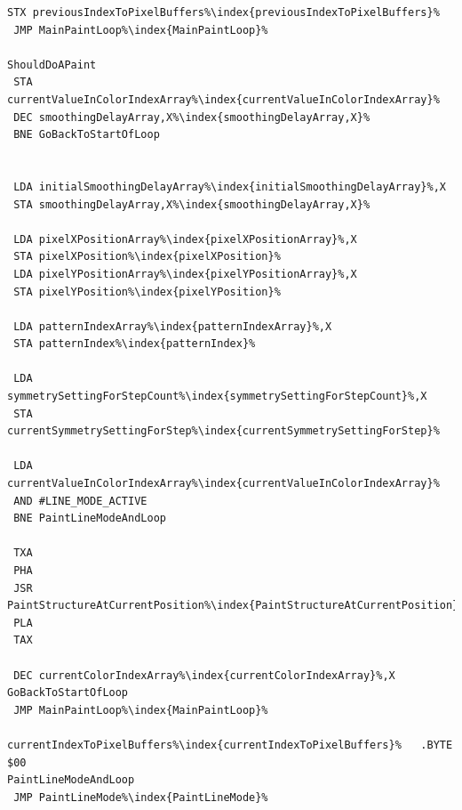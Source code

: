 \begin{minipage}[b]{0.33\linewidth}
\begin{lrbox}{\mybox}
\begin{lstlisting}[basicstyle=\ttfamily\tiny,escapechar=\%]
 STX previousIndexToPixelBuffers%\index{previousIndexToPixelBuffers}%
 JMP MainPaintLoop%\index{MainPaintLoop}%

ShouldDoAPaint
 STA currentValueInColorIndexArray%\index{currentValueInColorIndexArray}%
 DEC smoothingDelayArray,X%\index{smoothingDelayArray,X}%
 BNE GoBackToStartOfLoop


 LDA initialSmoothingDelayArray%\index{initialSmoothingDelayArray}%,X
 STA smoothingDelayArray,X%\index{smoothingDelayArray,X}%

 LDA pixelXPositionArray%\index{pixelXPositionArray}%,X
 STA pixelXPosition%\index{pixelXPosition}%
 LDA pixelYPositionArray%\index{pixelYPositionArray}%,X
 STA pixelYPosition%\index{pixelYPosition}%

 LDA patternIndexArray%\index{patternIndexArray}%,X
 STA patternIndex%\index{patternIndex}%

 LDA symmetrySettingForStepCount%\index{symmetrySettingForStepCount}%,X
 STA currentSymmetrySettingForStep%\index{currentSymmetrySettingForStep}%

 LDA currentValueInColorIndexArray%\index{currentValueInColorIndexArray}%
 AND #LINE_MODE_ACTIVE
 BNE PaintLineModeAndLoop

 TXA
 PHA
 JSR PaintStructureAtCurrentPosition%\index{PaintStructureAtCurrentPosition}%
 PLA
 TAX

 DEC currentColorIndexArray%\index{currentColorIndexArray}%,X
GoBackToStartOfLoop
 JMP MainPaintLoop%\index{MainPaintLoop}%

currentIndexToPixelBuffers%\index{currentIndexToPixelBuffers}%   .BYTE $00
PaintLineModeAndLoop
 JMP PaintLineMode%\index{PaintLineMode}%
\end{lstlisting}
\end{lrbox}%
\scalebox{0.8}{\usebox{\mybox}}
\end{minipage}
\hspace{-0.1cm}

